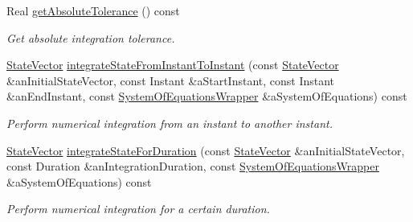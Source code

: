 \begin{DoxyCompactItemize}
Real \hyperlink{classostk_1_1astro_1_1_numerical_solver_a0f768255c5f2f51f395e4515db245930}{get\+Absolute\+Tolerance} () const
\begin{DoxyCompactList}\small\item\em Get absolute integration tolerance. \end{DoxyCompactList}\item 
\hyperlink{classostk_1_1astro_1_1_numerical_solver_a4a1673a6f74a72d6bacfe6480b9c1ccd}{State\+Vector} \hyperlink{classostk_1_1astro_1_1_numerical_solver_a7cfa85bfdcd4c258b2bc923150c7497b}{integrate\+State\+From\+Instant\+To\+Instant} (const \hyperlink{classostk_1_1astro_1_1_numerical_solver_a4a1673a6f74a72d6bacfe6480b9c1ccd}{State\+Vector} \&an\+Initial\+State\+Vector, const Instant \&a\+Start\+Instant, const Instant \&an\+End\+Instant, const \hyperlink{classostk_1_1astro_1_1_numerical_solver_aa39593aa5ff747e4f68492708b45bbc5}{System\+Of\+Equations\+Wrapper} \&a\+System\+Of\+Equations) const
\begin{DoxyCompactList}\small\item\em Perform numerical integration from an instant to another instant. \end{DoxyCompactList}\item 
\hyperlink{classostk_1_1astro_1_1_numerical_solver_a4a1673a6f74a72d6bacfe6480b9c1ccd}{State\+Vector} \hyperlink{classostk_1_1astro_1_1_numerical_solver_a20b6bec03702bbe76e919a4a3fbf6cd9}{integrate\+State\+For\+Duration} (const \hyperlink{classostk_1_1astro_1_1_numerical_solver_a4a1673a6f74a72d6bacfe6480b9c1ccd}{State\+Vector} \&an\+Initial\+State\+Vector, const Duration \&an\+Integration\+Duration, const \hyperlink{classostk_1_1astro_1_1_numerical_solver_aa39593aa5ff747e4f68492708b45bbc5}{System\+Of\+Equations\+Wrapper} \&a\+System\+Of\+Equations) const
\begin{DoxyCompactList}\small\item\em Perform numerical integration for a certain duration. \end{DoxyCompactList}\end{DoxyCompactItemize}
